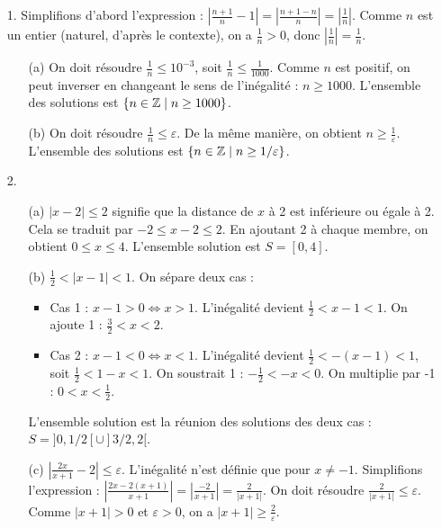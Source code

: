\documentclass[solutions]{exercices}
\begin{document}
\begin{solution}
	\begin{enumerate}
		\item[1.] Simplifions d'abord l'expression : $|\frac{n+1}{n} - 1| = |\frac{n+1-n}{n}| = |\frac{1}{n}|$. Comme $n$ est un entier (naturel, d'après le contexte), on a $\frac{1}{n} > 0$, donc $|\frac{1}{n}| = \frac{1}{n}$.
		      \begin{enumerate}
			      \item[(a)] On doit résoudre $\frac{1}{n} \leq 10^{-3}$, soit $\frac{1}{n} \leq \frac{1}{1000}$. Comme $n$ est positif, on peut inverser en changeant le sens de l'inégalité : $n \geq 1000$. L'ensemble des solutions est $\{n \in \mathbb{Z} \mid n \geq 1000\}$.
			      \item[(b)] On doit résoudre $\frac{1}{n} \leq \varepsilon$. De la même manière, on obtient $n \geq \frac{1}{\varepsilon}$. L'ensemble des solutions est $\{n \in \mathbb{Z} \mid n \geq 1/\varepsilon\}$.
		      \end{enumerate}
		\item[2.]
		      \begin{enumerate}
			      \item[(a)] $|x-2| \leq 2$ signifie que la distance de $x$ à 2 est inférieure ou égale à 2. Cela se traduit par $-2 \leq x-2 \leq 2$. En ajoutant 2 à chaque membre, on obtient $0 \leq x \leq 4$. L'ensemble solution est $S = [0, 4]$.
			      \item[(b)] $\frac{1}{2} < |x-1| < 1$. On sépare deux cas :
			            \begin{itemize}
				            \item Cas 1 : $x-1 > 0 \iff x > 1$. L'inégalité devient $\frac{1}{2} < x-1 < 1$. On ajoute 1 : $\frac{3}{2} < x < 2$.
				            \item Cas 2 : $x-1 < 0 \iff x < 1$. L'inégalité devient $\frac{1}{2} < -(x-1) < 1$, soit $\frac{1}{2} < 1-x < 1$. On soustrait 1 : $-\frac{1}{2} < -x < 0$. On multiplie par -1 : $0 < x < \frac{1}{2}$.
			            \end{itemize}
			            L'ensemble solution est la réunion des solutions des deux cas : $S = ]0, 1/2[ \cup ]3/2, 2[$.
			      \item[(c)] $|\frac{2x}{x+1} - 2| \leq \varepsilon$. L'inégalité n'est définie que pour $x \neq -1$.
			            Simplifions l'expression : $|\frac{2x - 2(x+1)}{x+1}| = |\frac{-2}{x+1}| = \frac{2}{|x+1|}$.
			            On doit résoudre $\frac{2}{|x+1|} \leq \varepsilon$. Comme $|x+1| > 0$ et $\varepsilon > 0$, on a $|x+1| \geq \frac{2}{\varepsilon}$.

\end{enumerate}
\end{enumerate}
\end{solution}
\end{document}
